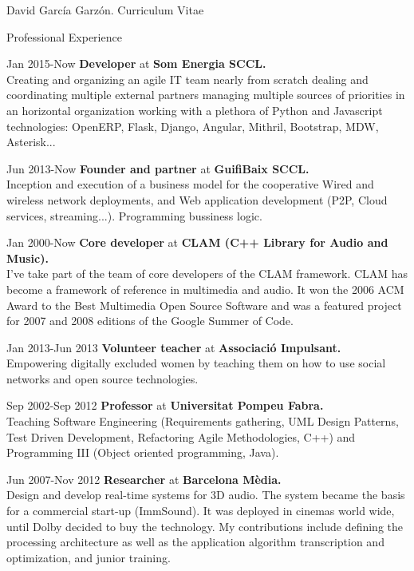 \documentclass{article}
\begin{document}
\begin{cv}{David García Garzón. Curriculum Vitae}
\begin{cvlist}{Professional Experience}

\item[Jan 2015-Now]
{\bf Developer} at
{\bf Som Energia SCCL.}\\
Creating and organizing an agile IT team nearly from scratch
dealing and coordinating multiple external partners
managing multiple sources of priorities in an horizontal organization
working with a plethora of Python and Javascript technologies:
OpenERP, Flask, Django, Angular, Mithril, Bootstrap, MDW, Asterisk...


\item[Jun 2013-Now]
{\bf Founder and partner} at
{\bf GuifiBaix SCCL.}\\
Inception and execution of a business model for the cooperative
Wired and wireless network deployments, and
Web application development (P2P, Cloud services, streaming...).
Programming bussiness logic.


\item[Jan 2000-Now]
{\bf Core developer} at
{\bf CLAM (C++ Library for Audio and Music).}\\
I've take part of the team of core developers of the CLAM framework.
CLAM has become a framework of reference in multimedia and audio.
It won the 2006 ACM Award to the Best Multimedia Open Source Software
and was a featured project for 2007 and 2008 editions of the Google Summer of Code.


\item[Jan 2013-Jun 2013]
{\bf Volunteer teacher} at
{\bf Associació Impulsant.}\\
Empowering digitally excluded women by teaching them on how to use social networks and open source technologies.


\item[Sep 2002-Sep 2012]
{\bf Professor} at
{\bf Universitat Pompeu Fabra.}\\
Teaching Software Engineering (Requirements gathering, UML
Design Patterns, Test Driven Development, Refactoring
Agile Methodologies, C++) and
Programming III (Object oriented programming, Java).


\item[Jun 2007-Nov 2012]
{\bf Researcher} at
{\bf Barcelona Mèdia.}\\
Design and develop real-time systems for 3D audio.
The system became the basis for a commercial start-up (ImmSound).
It was deployed in cinemas world wide, until Dolby decided to buy the technology.
My contributions include defining the processing architecture as well as the application
algorithm transcription and optimization, and junior training.



\end{cvlist}
\end{cv}
\end{document}
